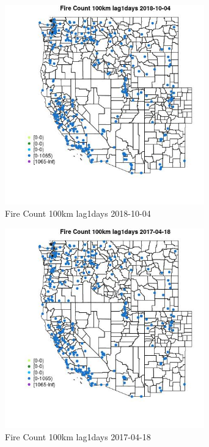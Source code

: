 \begin{figure} 
\centering  
\includegraphics[width=0.77\textwidth]{Code_Outputs/Report_ML_input_PM25_Step4_part_f_de_duplicated_aves_prioritize_24hr_obswNAs_MapObsFire_Count_100km_lag1days2018-10-04.jpg} 
\caption{\label{fig:Report_ML_input_PM25_Step4_part_f_de_duplicated_aves_prioritize_24hr_obswNAsMapObsFire_Count_100km_lag1days2018-10-04}Fire Count 100km lag1days 2018-10-04} 
\end{figure} 
 

\begin{figure} 
\centering  
\includegraphics[width=0.77\textwidth]{Code_Outputs/Report_ML_input_PM25_Step4_part_f_de_duplicated_aves_prioritize_24hr_obswNAs_MapObsFire_Count_100km_lag1days2017-04-18.jpg} 
\caption{\label{fig:Report_ML_input_PM25_Step4_part_f_de_duplicated_aves_prioritize_24hr_obswNAsMapObsFire_Count_100km_lag1days2017-04-18}Fire Count 100km lag1days 2017-04-18} 
\end{figure} 
 

